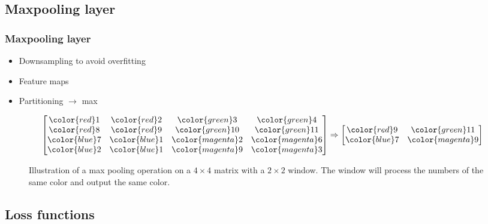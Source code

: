 \documentclass{beamer}
\begin{document}
\subsection{Maxpooling layer}

\begin{frame}
    \frametitle{Maxpooling layer}

    \begin{itemize}
        \item Downsampling to avoid overfitting
        \item Feature maps
        \pause
        \item Partitioning $\rightarrow$ max
    \end{itemize}


    \begin{figure}[htpb]
        \centering
        $$\begin{bmatrix}
            \color{red}1 & \color{red} 2 & \color{green} 3 & \color{green} 4 \\
            \color{red}8 & \color{red}9 & \color{green}10 & \color{green}11 \\
            \color{blue}7 & \color{blue}1 & \color{magenta}2 & \color{magenta}6 \\
            \color{blue}2 & \color{blue}1 & \color{magenta}9 & \color{magenta}3
            \end{bmatrix} \Rightarrow \begin{bmatrix}
            \color{red}9 & \color{green}11 \\
            \color{blue}7 & \color{magenta}9
            \end{bmatrix}$$
        \caption{Illustration of a max pooling operation on a $4\times 4$ matrix with a $2\times 2$ window. The window will process the numbers of the same color and output the same color.}
        \label{fig:max_pool}
    \end{figure}
\end{frame}

\subsection{Loss functions}
\end{document}
